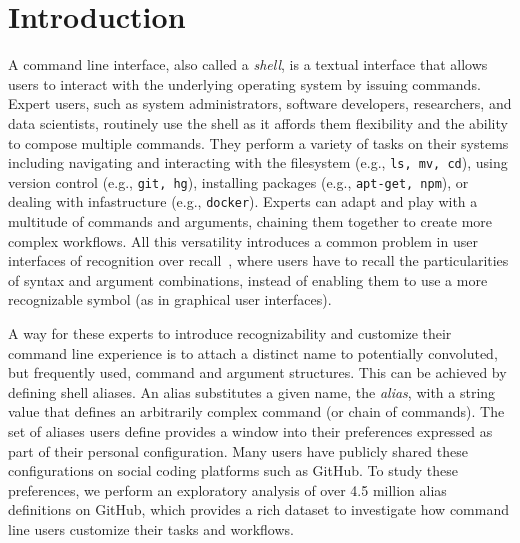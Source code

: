 \section{Introduction}

A command line interface, also called a \emph{shell}, is a textual interface that allows users to interact with the underlying operating system by issuing commands.
Expert users, such as system administrators, software developers, researchers, and data scientists, routinely use the shell as it affords them flexibility and the ability to compose multiple commands.
They perform a variety of tasks on their systems including navigating and interacting with the filesystem (e.g., \verb|ls, mv, cd|), using version control (e.g., \verb|git, hg|), installing packages (e.g., \verb|apt-get, npm|), or dealing with infastructure (e.g., \verb|docker|).
Experts can adapt and play with a multitude of commands and arguments, chaining them together to create more complex workflows.
All this versatility introduces a common problem in user interfaces of recognition over recall~\cite{nielsen:05}, where users have to recall the particularities of syntax and argument combinations, instead of enabling them to use a more recognizable symbol (as in graphical user interfaces).

A way for these experts to introduce recognizability and customize their command line experience is to attach a distinct name to potentially convoluted, but frequently used, command and argument structures.
This can be achieved by defining shell aliases.
An alias substitutes a given name, the \emph{alias}, with a string value that defines an arbitrarily complex command (or chain of commands).
The set of aliases users define provides a window into their preferences expressed as part of their personal configuration.
Many users have publicly shared these configurations on social coding platforms such as GitHub.
To study these preferences, we perform an exploratory analysis of over 4.5 million alias definitions on GitHub, which provides a rich dataset to investigate how command line users customize their tasks and workflows.

